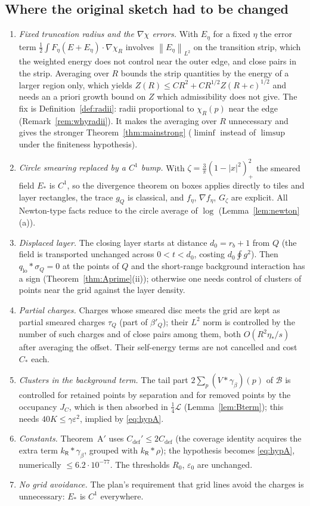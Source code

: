 \documentclass[11pt,reqno]{amsart}
\numberwithin{equation}{section}
\theoremstyle{plain}
\theoremstyle{definition}
\newcommand{\lo}{\mathrm{lo}}
\newcommand{\norm}[1]{\left\|#1\right\|}
\newcommand{\Cc}[1]{C_{\mathrm{#1}}}
\newcommand{\cL}{\mathcal{L}}
\newcommand{\cB}{\mathcal{B}}
\newcommand{\fR}{\mathsf{R}}
\begin{document}
\subsection{Where the original sketch had to be changed}
\begin{enumerate}[leftmargin=*]
\item \emph{Fixed truncation radius and the $\nabla\chi$ errors.}  With $E_\eta$ for a fixed $\eta$ the error term $\frac12\int F_\eta(E+E_\eta)\cdot\nabla\chi_R$ involves $\norm{E_\eta}_{L^2}$ on the transition strip, which the weighted energy does not control near the outer edge, and close pairs in the strip.  Averaging over $R$ bounds the strip quantities by the energy of a larger region only, which yields $Z(R)\le CR^2+CR^{1/2}Z(R+c)^{1/2}$ and needs an a priori growth bound on $Z$ which admissibility does not give.  The fix is Definition~\ref{def:radii}: radii proportional to $\chi_R(p)$ near the edge (Remark~\ref{rem:whyradii}).  It makes the averaging over $R$ unnecessary and gives the stronger Theorem~\ref{thm:mainstrong} ($\liminf$ instead of $\limsup$ under the finiteness hypothesis).
\item \emph{Circle smearing replaced by a $C^1$ bump.}  With $\zeta=\frac3\pi(1-|x|^2)_+^2$ the smeared field $E_*$ is $C^1$, so the divergence theorem on boxes applies directly to tiles and layer rectangles, the trace $g_Q$ is classical, and $f_\eta$, $\nabla f_\eta$, $G_\zeta$ are explicit.  All Newton-type facts reduce to the circle average of $\log$ (Lemma~\ref{lem:newton}(a)).
\item \emph{Displaced layer.}  The closing layer starts at distance $d_0=r_b+1$ from $Q$ (the field is transported unchanged across $0<t<d_0$, costing $d_0\oint g^2$).  Then $q_\lo*\sigma_Q=0$ at the points of $Q$ and the short-range background interaction has a sign (Theorem~\ref{thm:Aprime}(ii)); otherwise one needs control of clusters of points near the grid against the layer density.
\item \emph{Partial charges.}  Charges whose smeared disc meets the grid are kept as partial smeared charges $\tau_Q$ (part of $\beta'_Q$); their $L^2$ norm is controlled by the number of such charges and of close pairs among them, both $O(R^2\eta_*/s)$ after averaging the offset.  Their self-energy terms are not cancelled and cost $C_*$ each.
\item \emph{Clusters in the background term.}  The tail part $2\sum_p(V*\gamma_\beta)(p)$ of $\cB$ is controlled for retained points by separation and for removed points by the occupancy $J_C$, which is then absorbed in $\frac14\cL$ (Lemma~\ref{lem:Bterm}); this needs $40K\le\gamma\varepsilon^2$, implied by \eqref{eq:hypA}.
\item \emph{Constants.}  Theorem~A$'$ uses $\Cc{def}'\le2\Cc{def}$ (the coverage identity acquires the extra term $k_\fR*\gamma_\beta$, grouped with $k_\fR*\rho$); the hypothesis becomes \eqref{eq:hypA}, numerically $\le6.2\cdot10^{-77}$.  The thresholds $R_0$, $\varepsilon_0$ are unchanged.
\item \emph{No grid avoidance.}  The plan's requirement that grid lines avoid the charges is unnecessary: $E_*$ is $C^1$ everywhere.
\end{enumerate}
\end{document}

